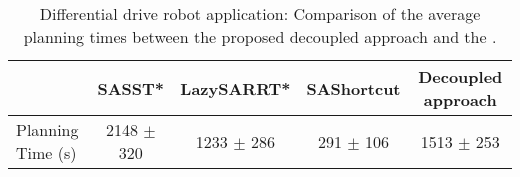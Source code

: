 \begin{table}[t!]
    \begin{tabular}{l|c|c|c|c|}
        \cline{2-5}
                                                & SASST* & LazySARRT* & SAShortcut & Decoupled approach \\ \hline
        \multicolumn{1}{|l|}{Planning Time (s)} &   2148 $\pm$ 320    &    1233 $\pm$ 286       &    291 $\pm$ 106         &        1513 $\pm$ 253           \\ \hline
    \end{tabular}
    \caption{
        \label{tab:lazySAMP_unic}
        Differential drive robot application: Comparison of the average planning times between the proposed decoupled approach and the .
    }
\end{table}